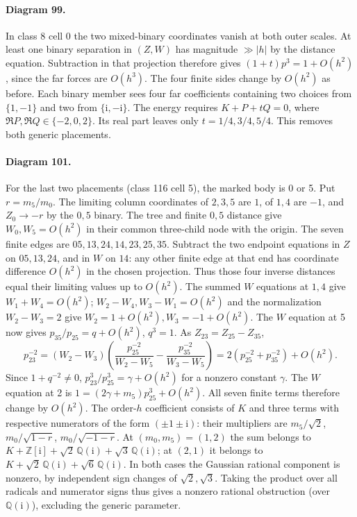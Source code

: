 \documentclass[11pt,letterpaper]{article}
\theoremstyle{definition}
\begin{document}
\paragraph{Diagram 99.}
In class 8 cell 0 the two mixed-binary coordinates vanish at both outer
scales. At least one binary separation in $(Z,W)$ has magnitude
$\gg |h|$ by the distance equation. Subtraction in that projection
therefore gives $(1+t)p^3=1+O(h^2)$, since the far forces are $O(h^3)$.
The four finite sides change by $O(h^2)$ as before. Each binary member
sees four far coefficients containing two choices from $\{1,-1\}$
and two from $\{\mathrm i,-\mathrm i\}$. The energy requires
$K+P+tQ=0$, where $\Re P,\Re Q\in\{-2,0,2\}$. Its real part leaves
only $t=1/4,3/4,5/4$. This removes both generic placements.

\paragraph{Diagram 101.}
For the last two placements (class 116 cell 5), the marked body is 0
or 5. Put $r=m_5/m_0$. The limiting column coordinates of $2,3,5$ are
$1$, of $1,4$ are $-1$, and $Z_0\to-r$ by the $0,5$ binary.
The tree and finite $0,5$ distance give $W_0,W_5=O(h^2)$ in their
common three-child node with the origin. The seven finite edges are
$05,13,24,14,23,25,35$. Subtract the two endpoint equations in $Z$
on $05,13,24$, and in $W$ on $14$: any other finite edge at that end
has coordinate difference $O(h^2)$ in the chosen projection.
Thus those four inverse distances equal their limiting values up to
$O(h^2)$. The summed $W$ equations at $1,4$ give $W_1+W_4=O(h^2)$;
$W_2-W_4,W_3-W_1=O(h^2)$ and the normalization $W_2-W_3=2$ give
$W_2=1+O(h^2), W_3=-1+O(h^2)$. The $W$ equation at 5 now gives
$p_{35}/p_{25}=q+O(h^2)$, $q^3=1$. As $Z_{23}=Z_{25}-Z_{35}$,
\[
 p_{23}^{-2}=(W_2-W_3)\left(\frac{p_{25}^{-2}}{W_2-W_5}
 -\frac{p_{35}^{-2}}{W_3-W_5}\right)
 =2(p_{25}^{-2}+p_{35}^{-2})+O(h^2).
\]
Since $1+q^{-2}\ne0$, $p_{23}^3/p_{25}^3=\gamma+O(h^2)$ for a
nonzero constant $\gamma$. The $W$ equation at 2 is
$1=(2\gamma+m_5)p_{25}^3+O(h^2)$. All seven finite terms therefore
change by $O(h^2)$. The order-$h$ coefficient consists of $K$ and three
terms with respective numerators of the form $(\pm1\pm\mathrm i)$:
their multipliers are $m_5/\sqrt2$, $m_0/\sqrt{1-r}$,
$m_0/\sqrt{-1-r}$. At $(m_0,m_5)=(1,2)$ the sum belongs to
$K+\mathbb Z[\mathrm i]+\sqrt2\,\mathbb Q(\mathrm i)
+\sqrt3\,\mathbb Q(\mathrm i)$; at $(2,1)$ it belongs to
$K+\sqrt2\,\mathbb Q(\mathrm i)+\sqrt6\,\mathbb Q(\mathrm i)$.
In both cases the Gaussian rational component is nonzero, by independent
sign changes of $\sqrt2,\sqrt3$. Taking the product over all radicals
and numerator signs thus gives a nonzero rational obstruction (over
$\mathbb Q(\mathrm i)$), excluding the generic parameter.
\end{document}
